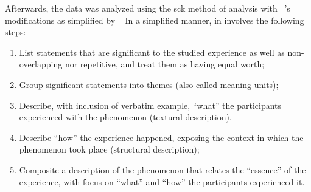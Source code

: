 
Afterwards, the data was analyzed using the \gls{sck} method of analysis with \citeauthor{moustakas1994phenomenological}~\cite{moustakas1994phenomenological}'s modifications as simplified by \citeauthor{creswell2016qualitative}~\cite{creswell2016qualitative}
In a simplified manner, in involves the following steps:
\begin{enumerate}
	\item List statements that are significant to the studied experience as well as non-overlapping nor repetitive, and treat them as having equal worth;
	\item Group significant statements into themes (also called meaning units);
	\item Describe, with inclusion of verbatim example, ``what'' the participants experienced with the phenomenon (textural description).
	\item Describe ``how'' the experience happened, exposing the context in which the phenomenon took place (structural description);
	\item Composite a description of the phenomenon that relates the ``essence'' of the experience, with focus on ``what'' and ``how'' the participants experienced it. 
\end{enumerate}
